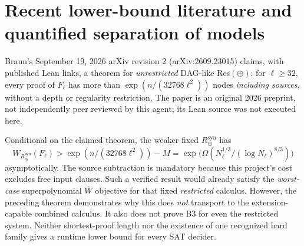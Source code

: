 \documentclass[11pt]{article}
\begin{document}
\section{Recent lower-bound literature and quantified separation of models}
Braun's September 19, 2026 arXiv revision 2 (arXiv:2609.23015) claims, with published Lean links, a theorem for \emph{unrestricted} DAG-like Res$(\oplus)$: for $\ell\ge32$, every proof of $F_\ell$ has more than $\exp(n/(32768\ell^2))$ nodes \emph{including sources}, without a depth or regularity restriction. The paper is an original 2026 preprint, not independently peer reviewed by this agent; its Lean source was not executed here.

Conditional on the claimed theorem, the weaker fixed $R_{\oplus}^{\mathrm{syn}}$ has
\[
W_{R_{\oplus}^{\mathrm{syn}}}(F_\ell)>
 \exp(n/(32768\ell^2))-M
 =\exp\!\bigl(\Omega(N_\ell^{1/3}/(\log N_\ell)^{8/3})\bigr)
\]
asymptotically. The source subtraction is mandatory because this project's cost excludes free input clauses. Such a verified result would already satisfy the \emph{worst-case} superpolynomial $\overline W$ objective for that fixed \emph{restricted} calculus. However, the preceding theorem demonstrates why this does \emph{not} transport to the extension-capable combined calculus. It also does not prove B3 for even the restricted system. Neither shortest-proof length nor the existence of one recognized hard family gives a runtime lower bound for every SAT decider.
\end{document}
